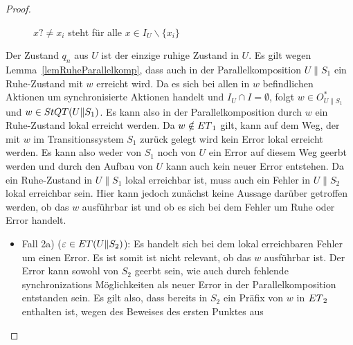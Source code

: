 \begin{proof}
\begin{itemize}
\begin{figure} [h!tbp]
\begin{center}
        \caption{$x?\neq x_i$ steht für alle $x\in I_U\backslash\{x_i\}$}
\label{UohneEmitI}
      \end{center}
      \end{figure}
      Der Zustand $q_n$ aus $U$ ist der einzige ruhige Zustand in $U$.
      Es gilt wegen Lemma~\ref{lemRuheParallelkomp}, dass auch in der
      Parallelkomposition $U\|S_1$ ein Ruhe-Zustand mit $w$ erreicht wird. Da
      es sich bei allen in $w$ befindlichen Aktionen um synchronisierte
      Aktionen handelt und $I_U\cap I=\emptyset$, folgt $w\in O_{U\|S_1}^*$ und
      $w\in StQT{}(U\|S_1)$. Es kann also in der Parallelkomposition durch $w$
      ein Ruhe-Zustand lokal erreicht werden. Da $w\notin ET{}_1$ gilt, kann
      auf dem Weg, der mit $w$ im Transitionssystem $S_1$ zurück gelegt wird
      kein Error lokal erreicht werden. Es kann also weder von $S_1$ noch von
      $U$ ein Error auf diesem Weg geerbt werden und durch den Aufbau von $U$
      kann auch kein neuer Error entstehen. Da ein Ruhe-Zustand in $U\|S_1$
      lokal erreichbar ist, muss auch ein Fehler in $U\|S_2$ lokal erreichbar
      sein. Hier kann jedoch zunächst keine Aussage darüber getroffen werden,
      ob das $w$ ausführbar ist und ob es sich bei dem Fehler um Ruhe oder
      Error handelt.
      \begin{itemize}
        \item Fall 2a) ($\varepsilon\in ET{}(U\|S_2)$): Es handelt sich bei
          dem lokal erreichbaren Fehler um einen Error. Es ist somit ist nicht
          relevant, ob das $w$ ausführbar ist. Der Error kann sowohl von $S_2$
          geerbt sein, wie auch durch fehlende synchronizations Möglichkeiten
          als neuer Error in der Parallelkomposition entstanden sein. Es gilt
          also, dass bereits in $S_2$ ein Präfix von $w$ in $ET{}_2$ enthalten
          ist, wegen des Beweises des ersten Punktes aus

\end{itemize}
\end{itemize}
\end{proof}
